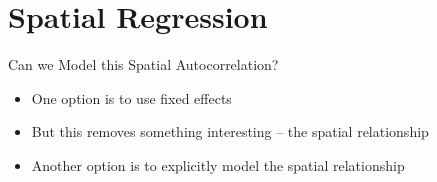 \documentclass[aspectratio = 169, 12pt]{beamer}\usepackage[]{graphicx}\usepackage[]{color}
\begin{document}
\section{Spatial Regression}
% 
% 
\begin{frame}{Can we Model this Spatial Autocorrelation?}
\begin{itemize}
\item One option is to use fixed effects
\item But this removes something interesting -- the spatial relationship
\item Another option is to explicitly model the spatial relationship
\end{itemize}
\end{frame}
\end{document}
